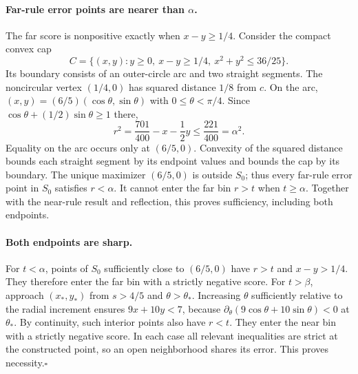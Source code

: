 \documentclass[11pt,a4paper]{article}
\numberwithin{equation}{section}
\begin{document}
\paragraph{Far-rule error points are nearer than $\alpha$.}
The far score is nonpositive exactly when $x-y\geq1/4$. Consider the compact convex cap
\[
C=\{(x,y):y\geq0,\ x-y\geq1/4,\ x^2+y^2\leq36/25\}.
\]
Its boundary consists of an outer-circle arc and two straight segments. The noncircular vertex $(1/4,0)$ has squared distance $1/8$ from $c$. On the arc, $(x,y)=(6/5)(\cos\theta,\sin\theta)$ with $0\leq\theta<\pi/4$. Since $\cos\theta+(1/2)\sin\theta\geq1$ there,
\begin{equation}
r^2=\frac{701}{400}-x-\frac12y\leq\frac{221}{400}=\alpha^2.
\end{equation}
Equality on the arc occurs only at $(6/5,0)$. Convexity of the squared distance bounds each straight segment by its endpoint values and bounds the cap by its boundary. The unique maximizer $(6/5,0)$ is outside $S_0$; thus every far-rule error point in $S_0$ satisfies $r<\alpha$. It cannot enter the far bin $r>t$ when $t\geq\alpha$. Together with the near-rule result and reflection, this proves sufficiency, including both endpoints.

\paragraph{Both endpoints are sharp.}
For $t<\alpha$, points of $S_0$ sufficiently close to $(6/5,0)$ have $r>t$ and $x-y>1/4$. They therefore enter the far bin with a strictly negative score. For $t>\beta$, approach $(x_*,y_*)$ from $s>4/5$ and $\theta>\theta_*$. Increasing $\theta$ sufficiently relative to the radial increment ensures $9x+10y<7$, because $\partial_\theta(9\cos\theta+10\sin\theta)<0$ at $\theta_*$. By continuity, such interior points also have $r<t$. They enter the near bin with a strictly negative score. In each case all relevant inequalities are strict at the constructed point, so an open neighborhood shares its error. This proves necessity.\hfill$\square$
\end{document}
